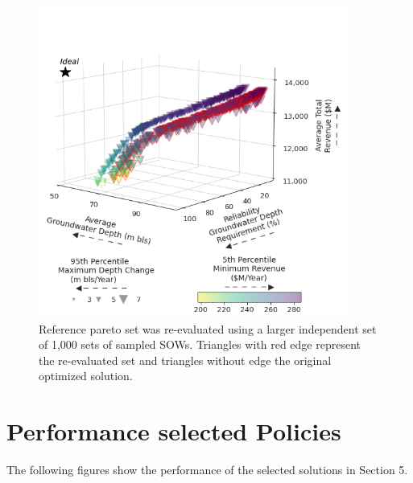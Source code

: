 \documentclass[11pt,a4paper]{article}
\begin{document}
\begin{figure}[H]
    \centering
    \includegraphics[width=0.9\textwidth]{./figs/validation_pareto_set.png}
    \caption{Reference pareto set was re-evaluated using a larger independent set of 1,000 sets of sampled SOWs. Triangles with red edge represent the re-evaluated set and triangles without edge the original optimized solution.}
    \label{fig:m1esh1}
\end{figure}

\section{Performance selected Policies}

The following figures show the performance of the selected solutions in Section 5.
\end{document}
